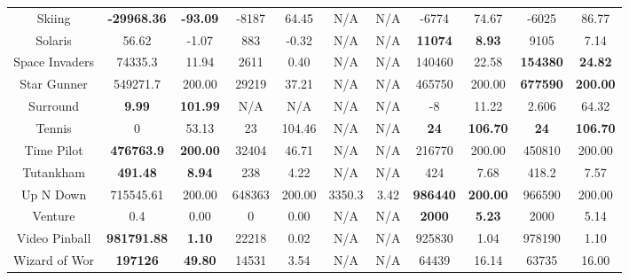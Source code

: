 \documentclass[nohyperref]{article}
\newcommand{\best}[1]{\textbf{#1}}
\theoremstyle{plain}
\begin{document}
\begin{table}[!hb]
\begin{center}
\begin{tabular}{|c |c c| c c| c c| c c| c c| }
 Skiing             & \textbf{-29968.36}      & \textbf{-93.09}      & -8187    &64.45          & N/A      & N/A     & -6774                   & 74.67          &-6025	          &86.77\\
 Solaris            & 56.62                   & -1.07              & 883                &-0.32          & N/A               & N/A   & \best{11074}  & \best{8.93 }&9105            &7.14\\
 Space Invaders     & 74335.3                 & 11.94                 & 2611               &0.40       & N/A               & N/A    & 140460 & 22.58&\textbf{154380}          &\textbf{24.82}    \\
 Star Gunner        &549271.7       & 200.00     & 29219    &37.21          & N/A      & N/A     & 465750      & 200.00                         &\textbf{677590}          &\textbf{200.00}\\
 Surround           & \textbf{9.99       }    & \textbf{101.99}     & N/A       &N/A         & N/A      & N/A     & -8          & 11.22                            &2.606           &64.32\\
 Tennis             & 0       & 53.13      & 23        &104.46        & N/A      & N/A     & \textbf{24}          & \textbf{106.70}       &\textbf{24}           &\textbf{106.70}\\
 Time Pilot         & \textbf{476763.9}       & \textbf{200.00}         & 32404    &46.71         & N/A      & N/A     & 216770      & 200.00    &450810          &200.00     \\
 Tutankham          & \textbf{491.48     }    & \textbf{8.94}   & 238       &4.22         & N/A      & N/A     & 424         & 7.68              &418.2           &7.57\\
 Up N Down          & 715545.61               & 200.00            & 648363            &200.00        & 3350.3            & 3.42   & \best{986440}        & \best{200.00} &966590        &200.00    \\
 Venture            & 0.4                     & 0.00        & 0                  &0.00       & N/A               & N/A     & \best{2000}          & \best{5.23}   &2000            &5.14    \\
 Video Pinball      & \textbf{981791.88}      & \textbf{1.10}      & 22218    &0.02     & N/A      & N/A     & 925830      & 1.04                                &978190          &1.10\\
 Wizard of Wor      & \textbf{197126         }& \textbf{49.80}      & 14531    &3.54     & N/A      & N/A     & 64439       & 16.14                             &63735           &16.00\\

\end{tabular}
\end{center}
\end{table}
\end{document}
